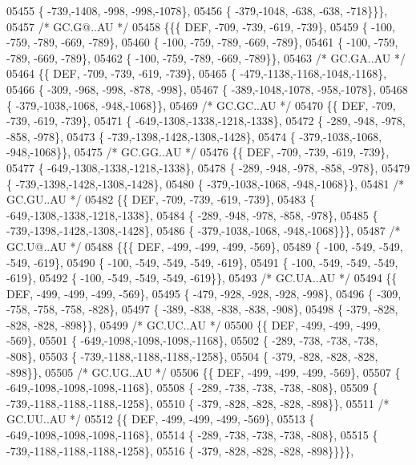 \begin{DoxyCode}
05455 \{ -739,-1408, -998, -998,-1078\},
05456 \{ -379,-1048, -638, -638, -718\}\}\},
05457 \textcolor{comment}{/* GC.G@..AU */}
05458 \{\{\{  DEF, -709, -739, -619, -739\},
05459 \{ -100, -759, -789, -669, -789\},
05460 \{ -100, -759, -789, -669, -789\},
05461 \{ -100, -759, -789, -669, -789\},
05462 \{ -100, -759, -789, -669, -789\}\},
05463 \textcolor{comment}{/* GC.GA..AU */}
05464 \{\{  DEF, -709, -739, -619, -739\},
05465 \{ -479,-1138,-1168,-1048,-1168\},
05466 \{ -309, -968, -998, -878, -998\},
05467 \{ -389,-1048,-1078, -958,-1078\},
05468 \{ -379,-1038,-1068, -948,-1068\}\},
05469 \textcolor{comment}{/* GC.GC..AU */}
05470 \{\{  DEF, -709, -739, -619, -739\},
05471 \{ -649,-1308,-1338,-1218,-1338\},
05472 \{ -289, -948, -978, -858, -978\},
05473 \{ -739,-1398,-1428,-1308,-1428\},
05474 \{ -379,-1038,-1068, -948,-1068\}\},
05475 \textcolor{comment}{/* GC.GG..AU */}
05476 \{\{  DEF, -709, -739, -619, -739\},
05477 \{ -649,-1308,-1338,-1218,-1338\},
05478 \{ -289, -948, -978, -858, -978\},
05479 \{ -739,-1398,-1428,-1308,-1428\},
05480 \{ -379,-1038,-1068, -948,-1068\}\},
05481 \textcolor{comment}{/* GC.GU..AU */}
05482 \{\{  DEF, -709, -739, -619, -739\},
05483 \{ -649,-1308,-1338,-1218,-1338\},
05484 \{ -289, -948, -978, -858, -978\},
05485 \{ -739,-1398,-1428,-1308,-1428\},
05486 \{ -379,-1038,-1068, -948,-1068\}\}\},
05487 \textcolor{comment}{/* GC.U@..AU */}
05488 \{\{\{  DEF, -499, -499, -499, -569\},
05489 \{ -100, -549, -549, -549, -619\},
05490 \{ -100, -549, -549, -549, -619\},
05491 \{ -100, -549, -549, -549, -619\},
05492 \{ -100, -549, -549, -549, -619\}\},
05493 \textcolor{comment}{/* GC.UA..AU */}
05494 \{\{  DEF, -499, -499, -499, -569\},
05495 \{ -479, -928, -928, -928, -998\},
05496 \{ -309, -758, -758, -758, -828\},
05497 \{ -389, -838, -838, -838, -908\},
05498 \{ -379, -828, -828, -828, -898\}\},
05499 \textcolor{comment}{/* GC.UC..AU */}
05500 \{\{  DEF, -499, -499, -499, -569\},
05501 \{ -649,-1098,-1098,-1098,-1168\},
05502 \{ -289, -738, -738, -738, -808\},
05503 \{ -739,-1188,-1188,-1188,-1258\},
05504 \{ -379, -828, -828, -828, -898\}\},
05505 \textcolor{comment}{/* GC.UG..AU */}
05506 \{\{  DEF, -499, -499, -499, -569\},
05507 \{ -649,-1098,-1098,-1098,-1168\},
05508 \{ -289, -738, -738, -738, -808\},
05509 \{ -739,-1188,-1188,-1188,-1258\},
05510 \{ -379, -828, -828, -828, -898\}\},
05511 \textcolor{comment}{/* GC.UU..AU */}
05512 \{\{  DEF, -499, -499, -499, -569\},
05513 \{ -649,-1098,-1098,-1098,-1168\},
05514 \{ -289, -738, -738, -738, -808\},
05515 \{ -739,-1188,-1188,-1188,-1258\},
05516 \{ -379, -828, -828, -828, -898\}\}\}\},

\end{DoxyCode}
